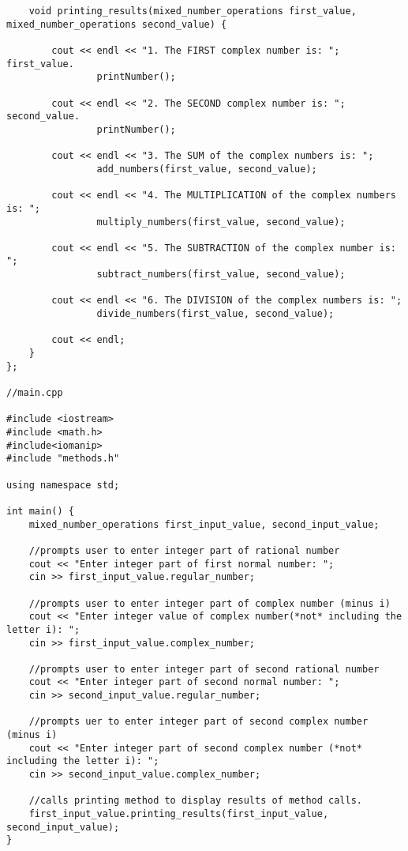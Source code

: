 \documentclass[11pt]{article}
\begin{document}
\begin{lstlisting}
    void printing_results(mixed_number_operations first_value, mixed_number_operations second_value) {

        cout << endl << "1. The FIRST complex number is: "; first_value.
                printNumber();

        cout << endl << "2. The SECOND complex number is: "; second_value.
                printNumber();

        cout << endl << "3. The SUM of the complex numbers is: ";
                add_numbers(first_value, second_value);

        cout << endl << "4. The MULTIPLICATION of the complex numbers is: ";
                multiply_numbers(first_value, second_value);

        cout << endl << "5. The SUBTRACTION of the complex number is: ";
                subtract_numbers(first_value, second_value);

        cout << endl << "6. The DIVISION of the complex numbers is: ";
                divide_numbers(first_value, second_value);

        cout << endl;
    }
};

//main.cpp

#include <iostream>
#include <math.h>
#include<iomanip>
#include "methods.h"

using namespace std;

int main() {
    mixed_number_operations first_input_value, second_input_value;

    //prompts user to enter integer part of rational number
    cout << "Enter integer part of first normal number: ";
    cin >> first_input_value.regular_number;

    //prompts user to enter integer part of complex number (minus i)
    cout << "Enter integer value of complex number(*not* including the letter i): ";
    cin >> first_input_value.complex_number;

    //prompts user to enter integer part of second rational number
    cout << "Enter integer part of second normal number: ";
    cin >> second_input_value.regular_number;

    //prompts uer to enter integer part of second complex number (minus i)
    cout << "Enter integer part of second complex number (*not* including the letter i): ";
    cin >> second_input_value.complex_number;

    //calls printing method to display results of method calls.
    first_input_value.printing_results(first_input_value, second_input_value);
}

\end{lstlisting}
\end{document}

